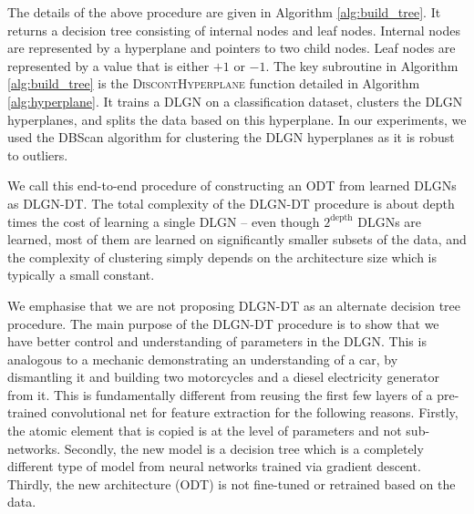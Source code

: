 \documentclass{article} %
\renewcommand{\>}{{\rightarrow}}
\renewcommand{\=}{\stackrel{\triangle}{=}}
\newcommand{\0}{{\mathbf 0}}
\renewcommand{\c}{{\mathbf c}}
\begin{document}
The details of the above procedure are given in Algorithm \ref{alg:build_tree}. It returns a decision tree consisting of internal nodes and leaf nodes. Internal nodes are represented by a hyperplane and pointers to two child nodes. Leaf nodes are represented by a value that is either $+1$ or $-1$.  The key subroutine in Algorithm \ref{alg:build_tree} is the \textsc{DiscontHyperplane} function detailed in Algorithm \ref{alg:hyperplane}. It trains a DLGN on a classification dataset, clusters the DLGN hyperplanes, and splits the data based on this hyperplane. In our experiments, we used the DBScan \citep{ester1996density} algorithm for clustering the DLGN hyperplanes as it is robust to outliers. 

We call this end-to-end procedure of constructing an ODT from learned DLGNs as DLGN-DT. The total complexity of the DLGN-DT procedure is about depth times the cost of learning a single DLGN -- even though $2^{\text{depth}}$ DLGNs are learned, most of them are learned on significantly smaller subsets of the data, and the complexity of clustering simply depends 
on the architecture size which is typically a small constant. 

We emphasise that we are not proposing DLGN-DT as an alternate decision tree procedure. The main purpose of the DLGN-DT procedure is to show that we have better control and understanding of parameters in the DLGN.  This is analogous to a mechanic demonstrating an understanding of a car, by dismantling it and building two motorcycles and a diesel electricity generator from it.  This is fundamentally different from reusing the first few layers of a pre-trained convolutional net for feature extraction for the following reasons. Firstly, the atomic element that is copied is at the level of parameters and not sub-networks. Secondly, the new model is a decision tree which is a completely different type of model from neural networks trained via gradient descent. Thirdly, the new architecture (ODT) is not fine-tuned or retrained based on the data.


\end{document}
